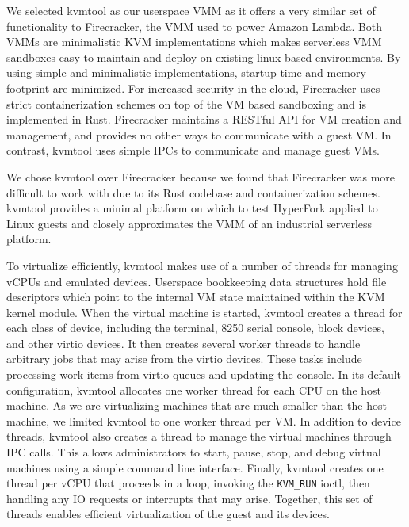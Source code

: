 We selected kvmtool as our userspace VMM as it offers a very similar set of
functionality to Firecracker, the VMM used to power Amazon Lambda. Both VMMs
are minimalistic KVM implementations which makes serverless VMM sandboxes easy
to maintain and deploy on existing linux based environments. By using simple
and minimalistic implementations, startup time and memory footprint are
minimized. For increased security in the cloud, Firecracker uses strict
containerization schemes on top of the VM based sandboxing and is implemented
in Rust. Firecracker maintains a RESTful API for VM creation and management,
and provides no other ways to communicate with a guest VM. In contrast, kvmtool
uses simple IPCs to communicate and manage guest VMs.

We chose kvmtool over Firecracker because we found that Firecracker was more
difficult to work with due to its Rust codebase and containerization schemes.
kvmtool provides a minimal platform on which to test HyperFork applied to Linux
guests and closely approximates the VMM of an industrial serverless platform.

To virtualize efficiently, kvmtool makes use of a number of threads for
managing vCPUs and emulated devices. Userspace bookkeeping data structures hold
file descriptors which point to the internal VM state maintained within the KVM
kernel module. When the virtual machine is started, kvmtool creates a thread
for each class of device, including the terminal, 8250 serial console, block
devices, and other virtio devices. It then creates several worker threads to
handle arbitrary jobs that may arise from the virtio devices. These tasks
include processing work items from virtio queues and updating the console. In
its default configuration, kvmtool allocates one worker thread for each CPU on
the host machine. As we are virtualizing machines that are much smaller than
the host machine, we limited kvmtool to one worker thread per VM. In addition
to device threads, kvmtool also creates a thread to manage the virtual machines
through IPC calls. This allows administrators to start, pause, stop, and debug
virtual machines using a simple command line interface. Finally, kvmtool
creates one thread per vCPU that proceeds in a loop, invoking the
\texttt{KVM\_RUN} ioctl, then handling any IO requests or interrupts that may
arise. Together, this set of threads enables efficient virtualization of the
guest and its devices.
